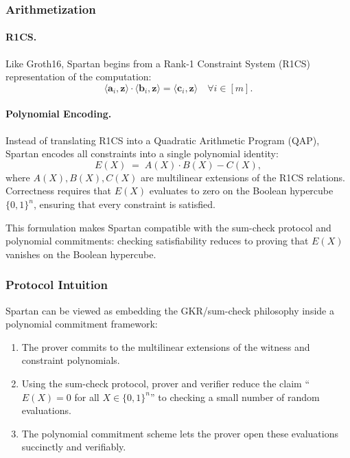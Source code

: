 \subsubsection*{Arithmetization}

\paragraph{R1CS.}
Like Groth16, Spartan begins from a Rank-1 Constraint System (R1CS) representation of the computation:  
\[
\langle \mathbf{a}_i, \mathbf{z} \rangle \cdot 
\langle \mathbf{b}_i, \mathbf{z} \rangle = 
\langle \mathbf{c}_i, \mathbf{z} \rangle \quad \forall i \in [m].
\]

\paragraph{Polynomial Encoding.}
Instead of translating R1CS into a Quadratic Arithmetic Program (QAP), Spartan encodes all constraints 
into a single polynomial identity:  
\[
E(X) \;=\; A(X) \cdot B(X) - C(X),
\]
where $A(X),B(X),C(X)$ are multilinear extensions of the R1CS relations.  
Correctness requires that $E(X)$ evaluates to zero on the Boolean hypercube $\{0,1\}^n$, 
ensuring that every constraint is satisfied.

This formulation makes Spartan compatible with the sum-check protocol and polynomial commitments:  
checking satisfiability reduces to proving that $E(X)$ vanishes on the Boolean hypercube.

\subsubsection*{Protocol Intuition}

Spartan can be viewed as embedding the GKR/sum-check philosophy inside a polynomial commitment framework:  

\begin{enumerate}
  \item The prover commits to the multilinear extensions of the witness and constraint polynomials.
  \item Using the sum-check protocol, prover and verifier reduce the claim “$E(X)=0$ for all $X\in\{0,1\}^n$”  
        to checking a small number of random evaluations.
  \item The polynomial commitment scheme lets the prover open these evaluations succinctly and verifiably.
\end{enumerate}

